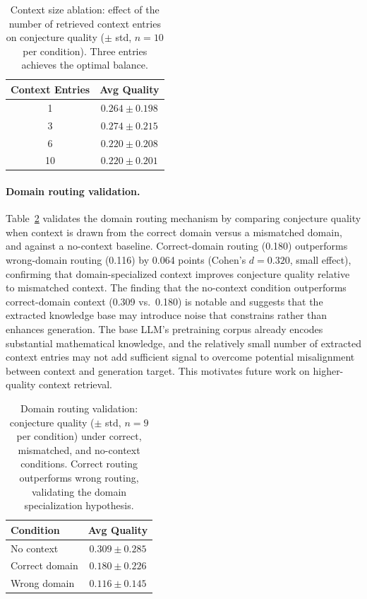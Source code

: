 \documentclass[11pt,a4paper]{article}
\begin{document}
\begin{table}[h]
\centering
\caption{Context size ablation: effect of the number of retrieved context entries on conjecture quality ($\pm$ std, $n{=}10$ per condition). Three entries achieves the optimal balance.}
\label{tab:ablation_context}
\small
\begin{tabular}{@{}cc@{}}
\toprule
\textbf{Context Entries} & \textbf{Avg Quality} \\
\midrule
1  & $0.264 \pm 0.198$ \\
3  & $\mathbf{0.274 \pm 0.215}$ \\
6  & $0.220 \pm 0.208$ \\
10 & $0.220 \pm 0.201$ \\
\bottomrule
\end{tabular}
\end{table}

\paragraph{Domain routing validation.}
Table~\ref{tab:ablation_routing} validates the domain routing mechanism by comparing conjecture quality when context is drawn from the correct domain versus a mismatched domain, and against a no-context baseline. Correct-domain routing (0.180) outperforms wrong-domain routing (0.116) by 0.064 points (Cohen's $d = 0.320$, small effect), confirming that domain-specialized context improves conjecture quality relative to mismatched context. The finding that the no-context condition outperforms correct-domain context (0.309 vs.\ 0.180) is notable and suggests that the extracted knowledge base may introduce noise that constrains rather than enhances generation. The base LLM's pretraining corpus already encodes substantial mathematical knowledge, and the relatively small number of extracted context entries may not add sufficient signal to overcome potential misalignment between context and generation target. This motivates future work on higher-quality context retrieval.

\begin{table}[h]
\centering
\caption{Domain routing validation: conjecture quality ($\pm$ std, $n{=}9$ per condition) under correct, mismatched, and no-context conditions. Correct routing outperforms wrong routing, validating the domain specialization hypothesis.}
\label{tab:ablation_routing}
\small
\begin{tabular}{@{}lc@{}}
\toprule
\textbf{Condition} & \textbf{Avg Quality} \\
\midrule
No context       & $0.309 \pm 0.285$ \\
Correct domain   & $0.180 \pm 0.226$ \\
Wrong domain     & $0.116 \pm 0.145$ \\
\bottomrule
\end{tabular}
\end{table}
\end{document}

